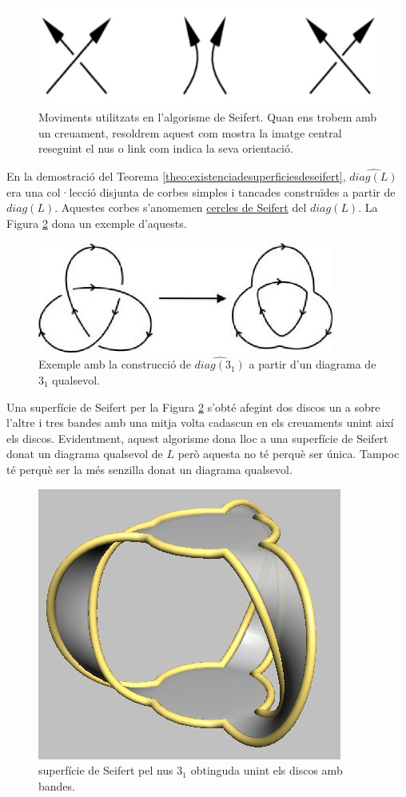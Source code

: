 \begin{figure}
	\centering
	\includegraphics[width=0.6\linewidth]{img/seifert.png}
	\caption{Moviments utilitzats en l'algorisme de Seifert. Quan ens trobem amb un creuament, resoldrem aquest com mostra la imatge central reseguint el nus o link com indica la seva orientació.}\label{fig:movimentsdeseifert}
\end{figure}

En la demostració del Teorema \ref{theo:existenciadesuperficiesdeseifert}, $\widehat{diag(L)}$ era una col·lecció disjunta de corbes simples i tancades construïdes a partir de $diag(L)$. Aquestes corbes s'anomemen \underline{cercles de Seifert} del $diag(L)$. La Figura \ref{fig:cerclesdeseifert} dona un exemple d'aquests.\\

\begin{figure}
	\centering
	\includegraphics[width=0.6\linewidth]{img/cerclesdeseifert.jpg}
	\caption{Exemple amb la construcció de $\widehat{diag(3_1)}$ a partir d'un diagrama de $3_1$ qualsevol.}\label{fig:cerclesdeseifert}
\end{figure}

Una superfície de Seifert per la Figura \ref{fig:cerclesdeseifert} s'obté afegint dos discos un a sobre l'altre i tres bandes amb una mitja volta cadascun en els creuaments unint així els discos. Evidentment, aquest algorisme dona lloc a una superfície de Seifert donat un diagrama qualsevol de $L$ però aquesta no té perquè ser única. Tampoc té perquè ser la més senzilla donat un diagrama qualsevol.

\begin{figure}
	\centering
	\includegraphics[width=0.6\linewidth]{img/superficiedeseifert.jpg}
	\caption{superfície de Seifert pel nus $3_1$ obtinguda unint els discos amb bandes.}\label{fig:superficiedeseifert2}
\end{figure}

